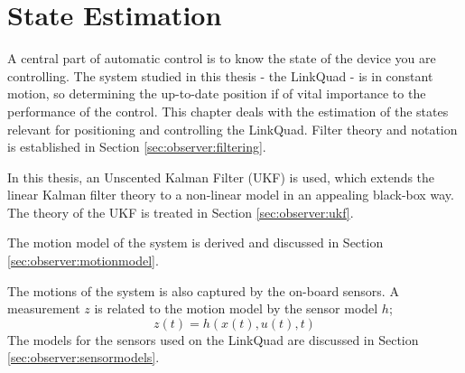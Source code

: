 \chapter{State Estimation}
\label{cha:observer}
    A central part of automatic control is to know the state of the device you are
    controlling. The system studied in this thesis - the LinkQuad - is in constant
    motion, so determining the up-to-date position if of vital importance to the performance
    of the control.
    This chapter deals with the estimation of the states relevant for positioning
    and controlling the LinkQuad.
    Filter theory and notation is established in Section \ref{sec:observer:filtering}.

    In this thesis, an Unscented Kalman Filter (UKF) is used, which extends the
    linear Kalman filter theory to a non-linear model in an appealing black-box way.
    The theory of the UKF is treated in Section \ref{sec:observer:ukf}.

    The motion model of the system is derived and discussed in Section \ref{sec:observer:motionmodel}.

    The motions of the system is also captured by the on-board sensors.
    A measurement $z$ is related to the motion model by the sensor model $h$;
    \begin{equation}
        z(t) = h(x(t),u(t),t)
    \end{equation}
    The models for the sensors used on the LinkQuad are discussed in
    Section \ref{sec:observer:sensormodels}.

    
    
    
    
